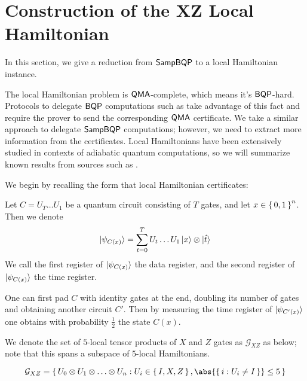 \section{Construction of the XZ Local Hamiltonian}
\label{sec:Hamiltonian}


In this section, we give a reduction from $\operatorname{\mathsf{SampBQP}}$ to a local Hamiltonian instance.

The local Hamiltonian problem is $\operatorname{\mathsf{QMA}}$-complete, which means it's $\operatorname{\mathsf{BQP}}$-hard.
Protocols to delegate $\operatorname{\mathsf{BQP}}$ computations such as \cite{FOCS:Mahadev18a}  take advantage of this fact and require the prover to send the corresponding $\operatorname{\mathsf{QMA}}$ certificate.
We take a similar approach to delegate $\operatorname{\mathsf{SampBQP}}$ computations; however, we need to extract more information from the certificates.
Local Hamiltonians have been extensively studied in contexts of adiabatic quantum computations, so we will summarize known results from sources such as \cite{adiabatic}.

We begin by recalling the form that local Hamiltonian certificates:

\begin{dfn}
	\label{dfn:groundstate}	
	Let $C=U_T\ldots U_1$ be a quantum circuit consisting of $T$ gates, and let $x\in\set{0,1}^n$. Then we denote
	$$\ket{\psi_{C(x)}}=\sum_{t=0}^TU_t\ldots U_1\ket{x}\otimes\ket{\hat{t}}$$
	We call the first register of $\ket{\psi_{C(x)}}$ the data register, and the second register of $\ket{\psi_{C(x)}}$ the time register.
\end{dfn}

\begin{rmk}
	\label{idpadding}
	One can first pad $C$ with identity gates at the end, doubling its number of gates and obtaining another circuit $C'$.
	Then by measuring the time register of $\ket{\psi_{C'(x)}}$ one obtains with probability $\frac{1}{2}$ the state $C(x)$.
\end{rmk}

We denote the set of $5$-local tensor products of $X$ and $Z$ gates as $\mathcal{G}_{XZ}$ as below; note that this spans a subspace of $5$-local Hamiltonians.
\begin{dfn}
	$$\mathcal{G}_{XZ}=\set{U_0\otimes U_1\otimes\ldots\otimes U_n: U_i\in\set{I,X,Z}, \abs{\set{i: U_i\ne I}}\leq 5}$$
\end{dfn}

